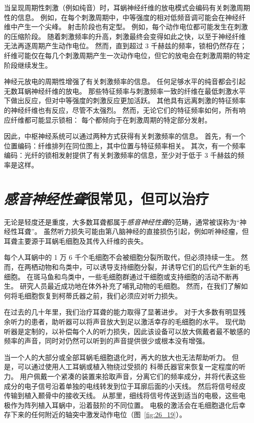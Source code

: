 当呈现周期性刺激（例如纯音）时，耳蜗神经纤维的放电模式会编码有关刺激周期性的信息。
例如，在每个刺激周期中，中等强度的相对低频音调可能会在神经纤维中产生一个尖峰。
射击阶段也有定型。
例如，每个动作电位都可能发生在刺激的压缩阶段。
随着刺激频率的升高，刺激最终会变得如此之快，以至于神经纤维无法再逐周期产生动作电位。
然而，直到超过 3 千赫兹的频率，锁相仍然存在；
纤维可能仅在每几个刺激周期产生一次动作电位，但它的放电会在刺激周期的特定阶段继续发生。


神经元放电的周期性增强了有关刺激频率的信息。
任何足够水平的纯音都会引起无数耳蜗神经纤维的放电。
那些特征频率与刺激频率一致的纤维在最低刺激水平下做出反应，但对中等强度的刺激反应更加活跃。
其他具有远离刺激的特征频率的神经纤维也有反应，尽管不太强烈。
然而，无论它们的特征频率如何，所有响应纤维都可能显示锁相：
每个都倾向于在刺激周期的特定部分发射。


因此，中枢神经系统可以通过两种方式获得有关刺激频率的信息。
首先，有一个位置编码：纤维排列在同位图上，其中位置与特征频率相关。
其次，有一个频率编码：光纤的锁相发射提供了有关刺激频率的信息，至少对于低于 3 千赫兹的频率是这样。



\section{\textit{感音神经性聋}很常见，但可以治疗}

无论是轻度还是重度，大多数耳聋都属于\textit{感音神经性聋}的范畴，通常被误称为“神经性耳聋”。
虽然听力损失可能由第八脑神经的直接损伤引起，例如听神经瘤，但耳聋主要源于耳蜗毛细胞及其传入纤维的丧失。


每个人耳蜗中的 1 万 6 千个毛细胞不会被细胞分裂所取代，但必须持续一生。
然而，在两栖动物和鸟类中，可以诱导支持细胞分裂，并诱导它们的后代产生新的毛细胞。
在斑马鱼和鸟类中，一些毛细胞群通过干细胞或支持细胞的活动不断再生。
研究人员最近成功地在体外补充了哺乳动物的毛细胞。 然而，在我们了解如何将毛细胞恢复到柯蒂氏器之前，我们必须应对听力损失。


在过去的几十年里，我们治疗耳聋的能力取得了显著进步。
对于大多数有明显残余听力的患者，助听器可以将声音放大到足以激活幸存的毛细胞的水平。
现代助听器是定制的，以补偿每个人的听力损失，因此该设备可以放大佩戴者最不敏感的频率的声音，同时对仍然可以听到的声音提供很少或根本没有增强。


当一个人的大部分或全部耳蜗毛细胞退化时，再大的放大也无法帮助听力。
但是，可以通过使用人工耳蜗或植入物绕过受损的 科蒂氏器官来恢复一定程度的听力。
用户佩戴一个紧凑的装置来拾取声音，分离它们的频率成分，并将代表这些成分的电子信号沿着单独的电线转发到位于耳廓后面的小天线。
然后将信号经皮传输到植入颞骨中的接收天线。
从那里，细线将信号传送到适当的电极，这些电极作为阵列植入耳蜗中，沿着鼓阶的不同位置。
电极的激活会在毛细胞退化后幸存下来的任何附近的轴突中激发动作电位（图~\ref{fig:26_19}）。


